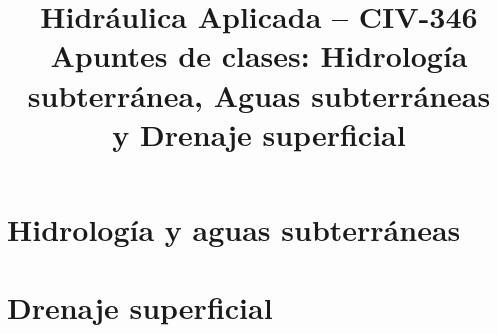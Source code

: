 \documentclass[11pt,a4paper]{report}
\title{\textbf{Hidráulica Aplicada -- CIV-346}\\[4pt]
  \large Apuntes de clases: Hidrología subterránea, Aguas subterráneas\\
  y Drenaje superficial}
\author{}
\date{}
\begin{document}
\maketitle
\tableofcontents

\part{Hidrología y aguas subterráneas}









\part{Drenaje superficial}




\end{document}
